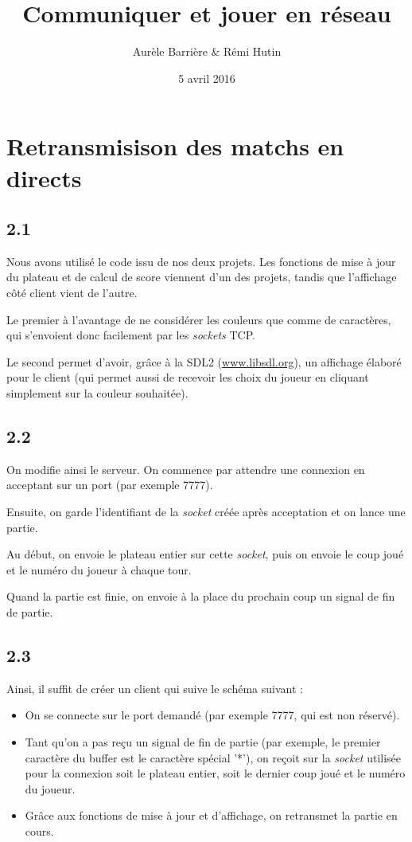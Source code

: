 \documentclass[12pt]{article}
\title{Communiquer et jouer en réseau}
\author{Aurèle Barrière \& Rémi Hutin}
\date{5 avril 2016}
\def\question#1{\subsection{#1}}
\def\sec#1{\section{#1}}
\begin{document}
\maketitle
\tableofcontents

\sec{Retransmisison des matchs en directs}
\question{2.1}
Nous avons utilisé le code issu de nos deux projets. Les fonctions de mise à jour du plateau et de calcul de score viennent d'un des projets, tandis que l'affichage côté client vient de l'autre.

Le premier à l'avantage de ne considérer les couleurs que comme de caractères, qui s'envoient donc facilement par les \textit{sockets} TCP.

Le second permet d'avoir, grâce à la SDL2 (\url{www.libsdl.org}), un affichage élaboré pour le client (qui permet aussi de recevoir les choix du joueur en cliquant simplement sur la couleur souhaitée).




\question{2.2}
On modifie ainsi le serveur. On commence par attendre une connexion en acceptant sur un port (par exemple 7777).

Ensuite, on garde l'identifiant de la \textit{socket} créée après acceptation et on lance une partie.

Au début, on envoie le plateau entier sur cette \textit{socket}, puis on envoie le coup joué et le numéro du joueur à chaque tour.

Quand la partie est finie, on envoie à la place du prochain coup un signal de fin de partie.


\question{2.3}
Ainsi, il suffit de créer un client qui suive le schéma suivant :
\begin{itemize}
\item On se connecte sur le port demandé (par exemple 7777, qui est non réservé).
\item Tant qu'on a pas reçu un signal de fin de partie (par exemple, le premier caractère du buffer est le caractère spécial '*'), on reçoit sur la \textit{socket} utilisée pour la connexion soit le plateau entier, soit le dernier coup joué et le numéro du joueur.
\item Grâce aux fonctions de mise à jour et d'affichage, on retransmet la partie en cours.
\end{itemize}

  
\end{document}
